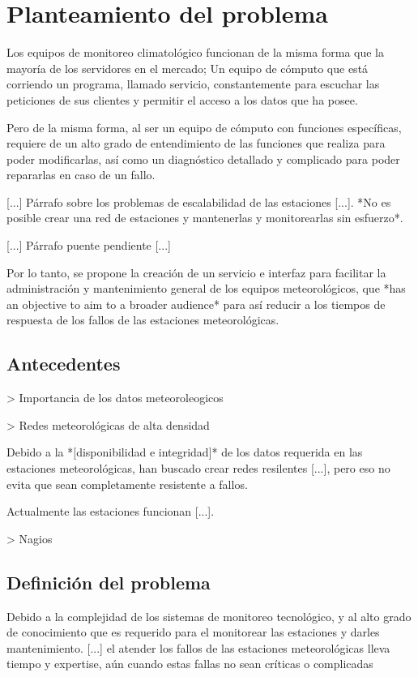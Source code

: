 \section{Planteamiento del problema}

Los equipos de monitoreo climatológico funcionan de la misma forma que la mayoría de los servidores en el mercado; Un equipo de cómputo que está corriendo un programa, llamado servicio, constantemente para escuchar las peticiones de sus clientes y permitir el acceso a los datos que ha posee.

Pero de la misma forma, al ser un equipo de cómputo con funciones específicas, requiere de un alto grado de entendimiento de las funciones que realiza para poder modificarlas, así como un diagnóstico detallado y complicado para poder repararlas en caso de un fallo.

[...] Párrafo sobre los problemas de escalabilidad de las estaciones [...]. *No es posible crear una red de estaciones y mantenerlas y monitorearlas sin esfuerzo*.

[...] Párrafo puente pendiente [...]

Por lo tanto, se propone la creación de un servicio e interfaz para facilitar la administración y mantenimiento general de los equipos meteorológicos, que *has an objective to aim to a broader audience* para así reducir a los tiempos de respuesta de los fallos de las estaciones meteorológicas.


\subsection{Antecedentes}\label{sec:Ant}

> Importancia de los datos meteoroleogicos

> Redes meteorológicas de alta densidad



Debido a la *[disponibilidad e integridad]* de los datos requerida en las estaciones meteorológicas, han buscado crear redes resilentes [...], pero eso no evita que sean completamente resistente a fallos.

Actualmente las estaciones funcionan [...].

> Nagios

\subsection{Definición del problema}

Debido a la complejidad de los sistemas de monitoreo tecnológico, y al alto grado de conocimiento que es requerido para el monitorear las estaciones y darles mantenimiento. [...] el atender los fallos de las estaciones meteorológicas lleva tiempo y expertise, aún cuando estas fallas no sean críticas o complicadas
